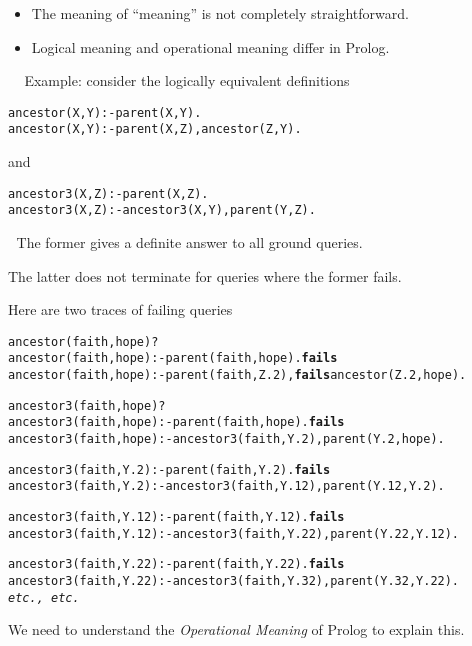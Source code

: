 \documentclass{popl}
\newenvironment{smalltt}{\begin{alltt}\smaller}{\end{alltt}}
\newcommand{\rmbox}[1]{\mbox{{\rm #1}}}
\def\fails{\textrm{\textbf{fails}}}
\begin{document}
\begin{foil} 
\begin{cframed}[6.7in]
\begin{itemize}
        \item The meaning of ``meaning'' is not completely straightforward.
        \item Logical meaning and operational meaning differ in Prolog.
\end{itemize}
\end{cframed}

Example: consider the logically equivalent definitions
\begin{smalltt}
        ancestor(X, Y)   :- parent(X, Y).
        ancestor(X, Y)   :- parent(X, Z), ancestor(Z, Y).
\end{smalltt}
and
\begin{smalltt}
        ancestor3(X, Z) :- parent(X, Z).
        ancestor3(X, Z) :- ancestor3(X, Y), parent(Y, Z).
\end{smalltt}

The former gives a definite answer to all ground queries. 

The latter does not terminate for queries where the former fails.
\begin{note}
Here are two traces of failing queries
\begin{alltt}\small
 ancestor(faith, hope)?
 ancestor(faith, hope) :-  parent(faith, hope). \fails
 ancestor(faith, hope) :-  parent(faith, Z.2), \fails ancestor(Z.2, hope).
\end{alltt}


\begin{alltt}\small
 ancestor3(faith, hope)?
 ancestor3(faith, hope) :-  parent(faith, hope). \fails 
 ancestor3(faith, hope) :-  ancestor3(faith, Y.2), parent(Y.2, hope).
 
    ancestor3(faith, Y.2)  :-  parent(faith, Y.2). \fails
    ancestor3(faith, Y.2)  :-  ancestor3(faith, Y.12), parent(Y.12, Y.2).
 
       ancestor3(faith, Y.12) :-  parent(faith, Y.12). \fails
       ancestor3(faith, Y.12) :-  ancestor3(faith, Y.22), parent(Y.22, Y.12).
 
 
          ancestor3(faith, Y.22) :-  parent(faith, Y.22). \fails
          ancestor3(faith, Y.22) :-  ancestor3(faith, Y.32), parent(Y.32, Y.22).
          \rmbox{{\it etc., etc.}}
\end{alltt}
\end{note}

We need to understand the {\it Operational Meaning} of Prolog to explain this.
\end{foil}
\end{document}
